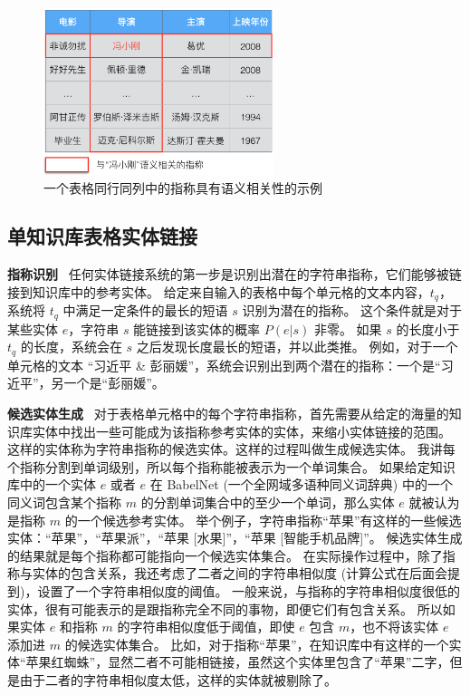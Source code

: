 \begin{figure}[htbp]
\centering
\includegraphics[width=0.6\textwidth]{img/table}
\caption{一个表格同行同列中的指称具有语义相关性的示例}
\label{table}
\end{figure}

\subsection{单知识库表格实体链接}\label{single}

\noindent\textbf{指称识别} \ 
任何实体链接系统的第一步是识别出潜在的字符串指称，它们能够被链接到知识库中的参考实体。
给定来自输入的表格中每个单元格的文本内容，$t_q$，系统将 $t_q$ 中满足一定条件的最长的短语 $s$ 识别为潜在的指称。
这个条件就是对于某些实体 $e$，字符串 $s$ 能链接到该实体的概率 $P(e|s)$ 非零。
如果 $s$ 的长度小于 $t_q$ 的长度，系统会在 $s$ 之后发现长度最长的短语，并以此类推。
例如，对于一个单元格的文本 ``习近平 \& 彭丽媛''，系统会识别出到两个潜在的指称：一个是``习近平''，另一个是``彭丽媛''。\newline


\noindent\textbf{候选实体生成} \ 
对于表格单元格中的每个字符串指称，首先需要从给定的海量的知识库实体中找出一些可能成为该指称参考实体的实体，来缩小实体链接的范围。
这样的实体称为字符串指称的候选实体。这样的过程叫做生成候选实体。
我讲每个指称分割到单词级别，所以每个指称能被表示为一个单词集合。
如果给定知识库中的一个实体 $e$ 或者 $e$ 在 BabelNet\cite{navigli2010babelnet} (一个全网域多语种同义词辞典) 中的一个同义词包含某个指称 $m$ 的分割单词集合中的至少一个单词，那么实体 $e$ 就被认为是指称 $m$ 的一个候选参考实体。
举个例子，字符串指称``苹果''有这样的一些候选实体：``苹果''，``苹果派''，``苹果 [水果]''，``苹果 [智能手机品牌]''。
候选实体生成的结果就是每个指称都可能指向一个候选实体集合。
在实际操作过程中，除了指称与实体的包含关系，我还考虑了二者之间的字符串相似度 (计算公式在后面会提到)，设置了一个字符串相似度的阈值。
一般来说，与指称的字符串相似度很低的实体，很有可能表示的是跟指称完全不同的事物，即便它们有包含关系。
所以如果实体 $e$ 和指称 $m$ 的字符串相似度低于阈值，即使 $e$ 包含 $m$，也不将该实体 $e$ 添加进 $m$ 的候选实体集合。
比如，对于指称``苹果''，在知识库中有这样的一个实体``苹果红蜘蛛''，显然二者不可能相链接，虽然这个实体里包含了``苹果''二字，但是由于二者的字符串相似度太低，这样的实体就被剔除了。
\newline

